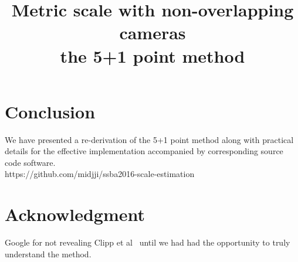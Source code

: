 \documentclass{SSBAtran}
\begin{document}
%
\title{Metric scale with non-overlapping cameras\\ the 5+1 point method}


\author{
}

\maketitle








\section{Conclusion}
We have presented a re-derivation of the 5+1 point method along with practical details for the effective implementation accompanied by corresponding source code software.
\\ 
\newline
https://github.com/midjji/ssba2016-scale-estimation


\section*{Acknowledgment}
Google for not revealing Clipp et al~\cite{clipp2008robust} until we had had the opportunity to truly understand the method. 

\vspace{2mm} %
\newpage 



\end{document}
